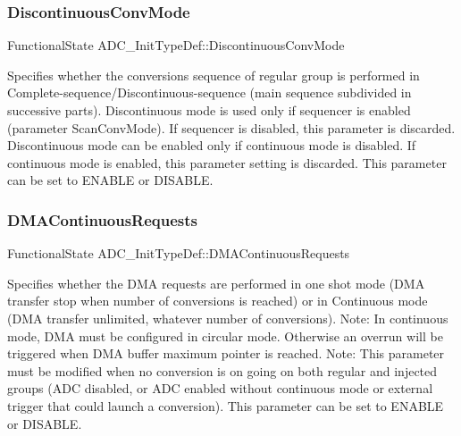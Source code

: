 \subsubsection{\texorpdfstring{DiscontinuousConvMode}{DiscontinuousConvMode}}
{\footnotesize\ttfamily Functional\+State A\+D\+C\+\_\+\+Init\+Type\+Def\+::\+Discontinuous\+Conv\+Mode}

Specifies whether the conversions sequence of regular group is performed in Complete-\/sequence/\+Discontinuous-\/sequence (main sequence subdivided in successive parts). Discontinuous mode is used only if sequencer is enabled (parameter \textquotesingle{}Scan\+Conv\+Mode\textquotesingle{}). If sequencer is disabled, this parameter is discarded. Discontinuous mode can be enabled only if continuous mode is disabled. If continuous mode is enabled, this parameter setting is discarded. This parameter can be set to E\+N\+A\+B\+LE or D\+I\+S\+A\+B\+LE. \mbox{\label{struct_a_d_c___init_type_def_a2c35c52d6f47c62915fa7d011e526510}} 
\subsubsection{\texorpdfstring{DMAContinuousRequests}{DMAContinuousRequests}}
{\footnotesize\ttfamily Functional\+State A\+D\+C\+\_\+\+Init\+Type\+Def\+::\+D\+M\+A\+Continuous\+Requests}

Specifies whether the D\+MA requests are performed in one shot mode (D\+MA transfer stop when number of conversions is reached) or in Continuous mode (D\+MA transfer unlimited, whatever number of conversions). Note\+: In continuous mode, D\+MA must be configured in circular mode. Otherwise an overrun will be triggered when D\+MA buffer maximum pointer is reached. Note\+: This parameter must be modified when no conversion is on going on both regular and injected groups (A\+DC disabled, or A\+DC enabled without continuous mode or external trigger that could launch a conversion). This parameter can be set to E\+N\+A\+B\+LE or D\+I\+S\+A\+B\+LE. \mbox{\label{struct_a_d_c___init_type_def_ae3eedd269c3acc6c6933e8a252c36e71}} 
